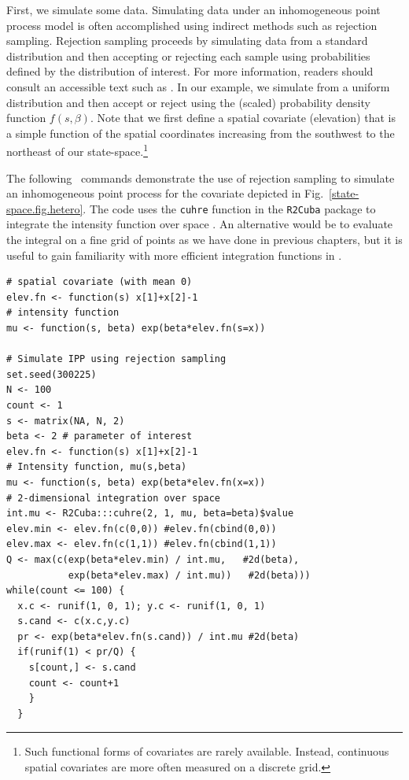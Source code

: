 First, we simulate some data. Simulating data under an inhomogeneous point process model is often
accomplished using indirect methods such as rejection
sampling. Rejection sampling proceeds by
simulating data from a standard distribution and then accepting or
rejecting each sample using probabilities defined by the distribution
of interest. For more information, readers should consult an
accessible text such as \citet{robert_casella:2010}. In our example, we
simulate from a uniform distribution and then accept or reject using
the (scaled) probability density function $f(s, \beta)$. Note that we first define a
spatial covariate (elevation) that is a simple function of the spatial
coordinates increasing from the southwest to the northeast of our
state-space.\footnote{Such functional forms of
covariates are rarely available. Instead,  continuous spatial
covariates are more often measured on a discrete grid.}

The following \R~commands demonstrate the use of rejection sampling to
simulate an inhomogeneous point process for the covariate depicted in
Fig.~\ref{state-space.fig.hetero}. The code uses the \verb+cuhre+ function in
the {\tt R2Cuba} package to integrate the intensity function over
space \citep{hahn_etal:2011}. An alternative would be to evaluate the
integral on a fine grid of points as we have done in previous
chapters, but it is useful to gain familiarity with more efficient
integration functions in \R.

\begin{small}
\begin{verbatim}
# spatial covariate (with mean 0)
elev.fn <- function(s) x[1]+x[2]-1
# intensity function
mu <- function(s, beta) exp(beta*elev.fn(s=x))

# Simulate IPP using rejection sampling
set.seed(300225)
N <- 100
count <- 1
s <- matrix(NA, N, 2)
beta <- 2 # parameter of interest
elev.fn <- function(s) x[1]+x[2]-1
# Intensity function, mu(s,beta)
mu <- function(s, beta) exp(beta*elev.fn(x=x))
# 2-dimensional integration over space
int.mu <- R2Cuba:::cuhre(2, 1, mu, beta=beta)$value
elev.min <- elev.fn(c(0,0)) #elev.fn(cbind(0,0))
elev.max <- elev.fn(c(1,1)) #elev.fn(cbind(1,1))
Q <- max(c(exp(beta*elev.min) / int.mu,   #2d(beta),
           exp(beta*elev.max) / int.mu))   #2d(beta)))
while(count <= 100) {
  x.c <- runif(1, 0, 1); y.c <- runif(1, 0, 1)
  s.cand <- c(x.c,y.c)
  pr <- exp(beta*elev.fn(s.cand)) / int.mu #2d(beta)
  if(runif(1) < pr/Q) {
    s[count,] <- s.cand
    count <- count+1
    }
  }
\end{verbatim}
\end{small}


